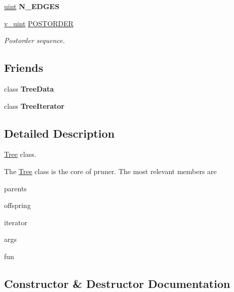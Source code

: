 \begin{DoxyCompactItemize}
\item 
\hyperlink{typedefs_8h_a91ad9478d81a7aaf2593e8d9c3d06a14}{uint} {\bfseries N\+\_\+\+E\+D\+G\+ES}\hypertarget{classTree_a123cdf871af449443aa8b7c05029d72a}{}\label{classTree_a123cdf871af449443aa8b7c05029d72a}

\item 
\hyperlink{typedefs_8h_ad56dde311aef1af823f4351451e8a381}{v\+\_\+uint} \hyperlink{classTree_a310e76b803db38e7067514822b21a58f}{P\+O\+S\+T\+O\+R\+D\+ER}
\begin{DoxyCompactList}\small\item\em Postorder sequence. \end{DoxyCompactList}\end{DoxyCompactItemize}
\subsection*{Friends}
\begin{DoxyCompactItemize}
\item 
class {\bfseries Tree\+Data}\hypertarget{classTree_a3ef069a6a857ec671312e3f76cb5aa24}{}\label{classTree_a3ef069a6a857ec671312e3f76cb5aa24}

\item 
class {\bfseries Tree\+Iterator}\hypertarget{classTree_a925e5a7f5dc110e63f7062d0e6898af9}{}\label{classTree_a925e5a7f5dc110e63f7062d0e6898af9}

\end{DoxyCompactItemize}


\subsection{Detailed Description}
\hyperlink{classTree}{Tree} class. 

The \hyperlink{classTree}{Tree} class is the core of pruner. The most relevant members are
\begin{DoxyItemize}
\item {\ttfamily parents}
\item {\ttfamily offspring}
\item {\ttfamily iterator}
\item {\ttfamily args}
\item {\ttfamily fun} 
\end{DoxyItemize}

\subsection{Constructor \& Destructor Documentation}
